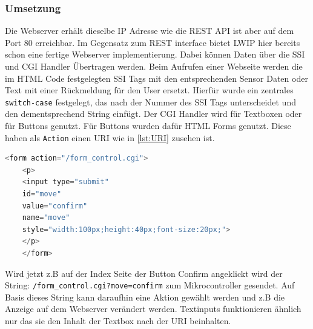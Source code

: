 \subsubsection{Umsetzung}
Die Webserver erhält dieselbe \ac{IP} Adresse wie die \ac{REST} \ac{API} ist aber auf dem Port 80 erreichbar. Im Gegensatz zum \ac{REST} interface bietet \ac{LWIP} hier bereits schon eine fertige Webserver implementierung. Dabei können Daten über die \ac{SSI} und \ac{CGI} Handler Übertragen werden. Beim Aufrufen einer Webseite werden die im \ac{HTML} Code festgelegten \ac{SSI} Tags mit den entsprechenden Sensor Daten oder Text mit einer Rückmeldung für den User ersetzt. Hierfür wurde ein zentrales \verb|switch-case| festgelegt, das nach der Nummer des \ac{SSI} Tags unterscheidet und den dementsprechend String einfügt. Der \ac{CGI} Handler wird für Textboxen oder für Buttons genutzt. Für Buttons wurden dafür \ac{HTML} Forms genutzt. Diese haben als \verb|Action| einen \ac{URI} wie in \autoref{lst:URI} zusehen ist. 
\begin{lstlisting}[language=C, caption={GET /data/adjustment Antwort Paket}, label={lst:URI}]
	<form action="/form_control.cgi">
	<p>
	<input type="submit" 
	id="move" 
	value="confirm" 
	name="move" 
	style="width:100px;height:40px;font-size:20px;">
	</p>
	</form>
\end{lstlisting}
Wird jetzt z.B auf der Index Seite der Button \glqq{}Confirm\grqq{} angeklickt wird der String: \verb|/form_control.cgi?move=confirm| zum Mikrocontroller gesendet. Auf Basis dieses String kann daraufhin eine Aktion gewählt werden und z.B die Anzeige auf dem Webserver verändert werden. Textinputs funktionieren ähnlich nur das sie den Inhalt der Textbox nach der \ac{URI} beinhalten.




